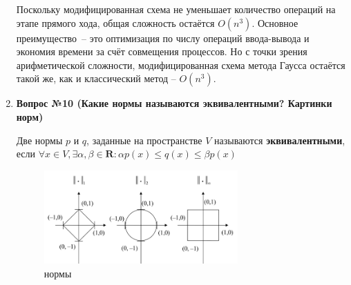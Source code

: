 \documentclass[12pt, a4paper]{article}
\begin{document}
\begin{enumerate}
		Поскольку модифицированная схема не уменьшает количество операций на этапе прямого хода, общая сложность остаётся $O(n^3)$. Основное преимущество~-- это оптимизация по числу операций ввода-вывода и экономия времени за счёт совмещения процессов. Но с точки зрения арифметической сложности, модифицированная схема метода Гаусса остаётся такой же, как и классический метод -- $O(n^3)$.
		
		\item \textbf{Вопрос №10 (Какие нормы называются эквивалентными? Картинки норм)}
		
			Две нормы $p$ и $q$, заданные на пространстве $V$ называются \textbf{эквивалентными}, если 
		$\forall x \in V, \exists \alpha,\beta \in \mathbf{R}: \alpha p(x) \le q(x) \le \beta p(x)$
		
			\begin{figure}[!h]
			\center
			\includegraphics[width=0.7\textwidth]{pic1}
			\caption{нормы}
			\label{pic1}
		\end{figure}		
		
	\end{enumerate}
	
	
\end{document}
